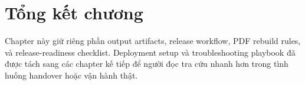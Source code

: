 \section{Tổng kết chương}

Chapter này giữ riêng phần output artifacts, release workflow, PDF rebuild rules, và release-readiness checklist. Deployment setup và troubleshooting playbook đã được tách sang các chapter kế tiếp để người đọc tra cứu nhanh hơn trong tình huống handover hoặc vận hành thật.
